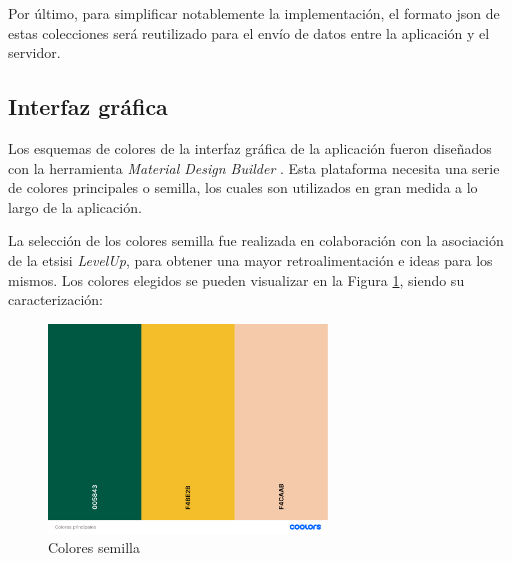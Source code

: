             Por último, para simplificar notablemente la implementación, el formato \gls{json} de estas colecciones será reutilizado para el envío de datos entre la aplicación y el servidor. 

            \clearpage  %
            
        \subsection{Interfaz gráfica}

            Los esquemas de colores de la interfaz gráfica de la aplicación fueron diseñados con la herramienta \textit{Material Design Builder} \cite{material_design_material_nodate-1}. Esta plataforma necesita una serie de colores principales o semilla, los cuales son utilizados en gran medida a lo largo de la aplicación.

            La selección de los colores semilla fue realizada en colaboración con la asociación de la \gls{etsisi} \textit{LevelUp}, para obtener una mayor retroalimentación e ideas para los mismos. Los colores elegidos se pueden visualizar en la Figura \ref{figure:disenio:colores_semilla}, siendo su caracterización:

            \begin{figure}[h]
                \centering
                \includegraphics[width=0.66\textwidth]{figures/diseno/colores/Colores principales.png}
                \caption{Colores semilla}
                \label{figure:disenio:colores_semilla}
            \end{figure}
    
